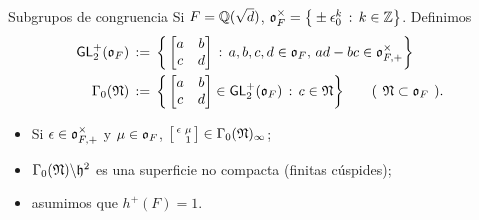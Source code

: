 \begin{frame}{Subgrupos de congruencia}
	Si $F=\bb Q(\sqrt d)$,
	$\oka F^\times=\big\{\pm\epsilon_0^k\,:\,k\in\bb Z\big\}$. Definimos
	\begin{align*}
		\GLtp[2](\oka{F}) & \,:=\,\bigg\{
			\begin{bmatrix} a & b \\ c & d \end{bmatrix} \,:\,
				a,b,c,d\in\oka{F},\,ad-bc\in\oka{F,+}^{\times}
				\bigg\} \\
		\Gamma_{0}(\frak{N}) & \,:=\, \bigg\{
			\begin{bmatrix} a & b \\ c & d \end{bmatrix}\in
				\GLtp[2](\oka{F}) \,:\,c\in\frak{N}\bigg\}
			\qquad\text{(\phantom)}\frak N\subset\oka F
				\text{\phantom().}
	\end{align*}
	\begin{obsSubgruposCongruencia}\label{obs:subgruposcongruencia}
		\begin{itemize}
			\item Si $\epsilon\in\oka{F,+}^\times$ y
				$\mu\in\oka F$,
				\begin{math}
					\left[\begin{smallmatrix}
						\epsilon & \mu\vphantom{1} \\
						& 1
					\end{smallmatrix}\right]\in
					\Gamma_0(\frak N)_\infty
				\end{math};
			\item $\Gamma_0(\frak N)\backslash\hP^2$ es una
				superficie no compacta (finitas c\'{u}spides);
			\item asumimos que $h^+(F)=1$.
		\end{itemize}
	\end{obsSubgruposCongruencia}
\end{frame}

